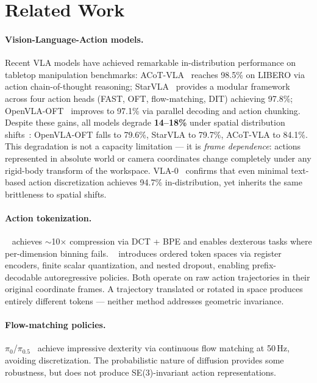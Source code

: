 
\section{Related Work}
\label{sec:related}

\paragraph{Vision-Language-Action models.}
Recent VLA models have achieved remarkable in-distribution performance on
tabletop manipulation benchmarks: \mbox{ACoT-VLA}~\cite{acot_vla_2026}
reaches 98.5\% on LIBERO via action chain-of-thought reasoning;
StarVLA~\cite{starvla_2026} provides a modular framework across four
action heads (FAST, OFT, flow-matching, DIT) achieving 97.8\%;
OpenVLA-OFT~\cite{openvla_oft_2025} improves to 97.1\% via parallel
decoding and action chunking.
Despite these gains, all models degrade \textbf{14–18\%} under spatial
distribution shifts~\cite{openvla_oft_2025,starvla_2026,acot_vla_2026}:
OpenVLA-OFT falls to 79.6\%, StarVLA to 79.7\%, ACoT-VLA to 84.1\%.
This degradation is not a capacity limitation — it is \emph{frame dependence}:
actions represented in absolute world or camera coordinates change completely
under any rigid-body transform of the workspace.
VLA-0~\cite{vla0_2025} confirms that even minimal text-based action
discretization achieves 94.7\% in-distribution, yet inherits the same
brittleness to spatial shifts.

\paragraph{Action tokenization.}
\fast{}~\cite{fast2025} achieves $\sim$10$\times$ compression via DCT + BPE
and enables dexterous tasks where per-dimension binning fails.
\oat{}~\cite{oat2026} introduces ordered token spaces via register encoders,
finite scalar quantization, and nested dropout, enabling prefix-decodable
autoregressive policies.
Both operate on raw action trajectories in their original coordinate frames.
A trajectory translated or rotated in space produces entirely different
tokens — neither method addresses geometric invariance.

\paragraph{Flow-matching policies.}
$\pi_0$/$\pi_{0.5}$~\cite{pi0_2024} achieve impressive dexterity via
continuous flow matching at 50\,Hz, avoiding discretization.
The probabilistic nature of diffusion provides some robustness, but does
not produce SE(3)-invariant action representations.

